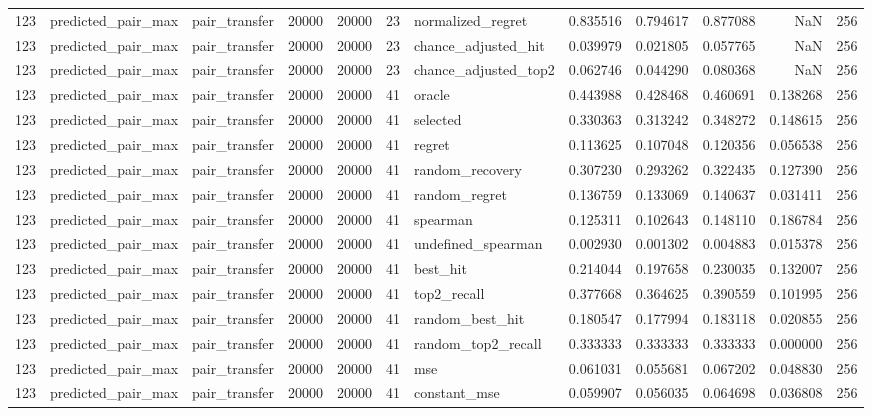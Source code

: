 \begin{tabular}{rllrrrlrrrrr}
123 & predicted_pair_max & pair_transfer & 20000 & 20000 & 23 & normalized_regret & 0.835516 & 0.794617 & 0.877088 & NaN & 256 \\
123 & predicted_pair_max & pair_transfer & 20000 & 20000 & 23 & chance_adjusted_hit & 0.039979 & 0.021805 & 0.057765 & NaN & 256 \\
123 & predicted_pair_max & pair_transfer & 20000 & 20000 & 23 & chance_adjusted_top2 & 0.062746 & 0.044290 & 0.080368 & NaN & 256 \\
123 & predicted_pair_max & pair_transfer & 20000 & 20000 & 41 & oracle & 0.443988 & 0.428468 & 0.460691 & 0.138268 & 256 \\
123 & predicted_pair_max & pair_transfer & 20000 & 20000 & 41 & selected & 0.330363 & 0.313242 & 0.348272 & 0.148615 & 256 \\
123 & predicted_pair_max & pair_transfer & 20000 & 20000 & 41 & regret & 0.113625 & 0.107048 & 0.120356 & 0.056538 & 256 \\
123 & predicted_pair_max & pair_transfer & 20000 & 20000 & 41 & random_recovery & 0.307230 & 0.293262 & 0.322435 & 0.127390 & 256 \\
123 & predicted_pair_max & pair_transfer & 20000 & 20000 & 41 & random_regret & 0.136759 & 0.133069 & 0.140637 & 0.031411 & 256 \\
123 & predicted_pair_max & pair_transfer & 20000 & 20000 & 41 & spearman & 0.125311 & 0.102643 & 0.148110 & 0.186784 & 256 \\
123 & predicted_pair_max & pair_transfer & 20000 & 20000 & 41 & undefined_spearman & 0.002930 & 0.001302 & 0.004883 & 0.015378 & 256 \\
123 & predicted_pair_max & pair_transfer & 20000 & 20000 & 41 & best_hit & 0.214044 & 0.197658 & 0.230035 & 0.132007 & 256 \\
123 & predicted_pair_max & pair_transfer & 20000 & 20000 & 41 & top2_recall & 0.377668 & 0.364625 & 0.390559 & 0.101995 & 256 \\
123 & predicted_pair_max & pair_transfer & 20000 & 20000 & 41 & random_best_hit & 0.180547 & 0.177994 & 0.183118 & 0.020855 & 256 \\
123 & predicted_pair_max & pair_transfer & 20000 & 20000 & 41 & random_top2_recall & 0.333333 & 0.333333 & 0.333333 & 0.000000 & 256 \\
123 & predicted_pair_max & pair_transfer & 20000 & 20000 & 41 & mse & 0.061031 & 0.055681 & 0.067202 & 0.048830 & 256 \\
123 & predicted_pair_max & pair_transfer & 20000 & 20000 & 41 & constant_mse & 0.059907 & 0.056035 & 0.064698 & 0.036808 & 256 \\

\end{tabular}
